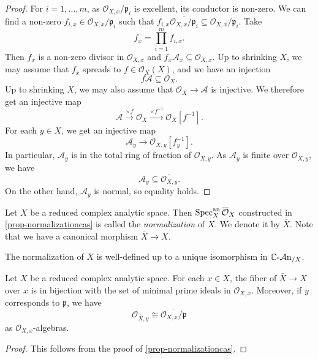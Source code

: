 \begin{proof}
    For $i=1,\ldots,m$, as $\mathcal{O}_{X,x}/\mathfrak{p}_i$ is excellent, its conductor is non-zero. We can find a non-zero $f_{i,x}\in \mathcal{O}_{X,x}/\mathfrak{p}_i$ such that $f_{i,x}\overline{\mathcal{O}_{X,x}/\mathfrak{p}_i}\subseteq \mathcal{O}_{X,x}/\mathfrak{p}_i$. Take 
    \[
        f_x=\prod_{i=1}^m f_{i,x}.  
    \]
    Then $f_x$ is a non-zero divisor in $\mathcal{O}_{X,x}$ and $f_x \mathcal{A}_x\subseteq \mathcal{O}_{X,x}$. Up to shrinking $X$, we may assume that $f_x$ spreads to $f\in \mathcal{O}_X(X)$, and we have an injection
    \[
        f\mathcal{A}\subseteq \mathcal{O}_X.  
    \]
    Up to shrinking $X$, we may also assume that $\mathcal{O}_X\rightarrow \mathcal{A}$ is injective. We therefore get an injective map
    \[
        \mathcal{A}\xrightarrow{\times f} \mathcal{O}_X  \xrightarrow{\times f^{-1}}\mathcal{O}_X[f^{-1}]. 
    \]
    For each $y\in X$, we get an injective map
    \[
        \mathcal{A}_y\rightarrow \mathcal{O}_{X,y}[f_y^{-1}].  
    \]
    In particular, $\mathcal{A}_y$ is in the total ring of fraction of $\mathcal{O}_{X,y}$. As $\mathcal{A}_y$ is finite over $\mathcal{O}_{X,y}$, we have
    \[
        \mathcal{A}_y\subseteq \overline{\mathcal{O}_{X,y}}.
    \]
    On the other hand, $\mathcal{A}_y$ is normal, so equality holds. 
\end{proof}

\begin{definition}
    Let $X$ be a reduced complex analytic space. Then $\operatorname{Spec}^{\mathrm{an}}_X \overline{\mathcal{O}}_X$ constructed in \cref{prop-normalizationcas} is called the \emph{normalization} of $X$. We denote it by $\bar{X}$.
    Note that we have a canonical morphism $\bar{X}\rightarrow X$. 
    
    The normalization of $X$ is well-defined up to a unique isomorphism in $\mathbb{C}\text{-}\mathcal{A}\mathrm{n}_{/X}$.
\end{definition}

\begin{proposition}\label{prop-normalizationbranches}
    Let $X$ be a reduced complex analytic space. For each $x\in X$, the fiber of $\bar{X}\rightarrow X$ over $x$ is in bijection with the set of minimal prime ideals in $\mathcal{O}_{X,x}$. Moreover, if $y$ corresponds to $\mathfrak{p}$, we have
    \[
      \mathcal{O}_{\bar{X},y}\cong  \overline{\mathcal{O}_{X,x}/\mathfrak{p}}
    \] 
    as $\mathcal{O}_{X,x}$-algebras.
\end{proposition}
\begin{proof}
    This follows from the proof of \cref{prop-normalizationcas}.   
\end{proof}



